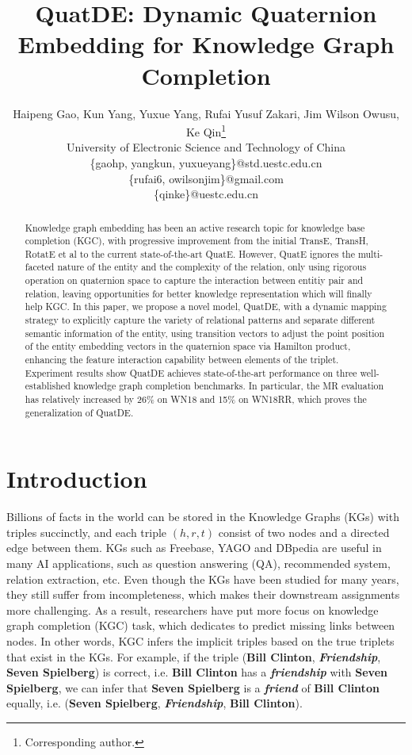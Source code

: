 \documentclass[letterpaper]{article} \usepackage{aaai20}  \usepackage{times}  \usepackage{helvet} \usepackage{courier}  \usepackage[hyphens]{url}  \usepackage{graphicx} \usepackage{lineno,hyperref,amsmath,amssymb}
\title{QuatDE: Dynamic Quaternion Embedding for Knowledge Graph Completion}
\author{Haipeng Gao, Kun Yang, Yuxue Yang, Rufai Yusuf Zakari, Jim Wilson Owusu, Ke Qin\thanks{Corresponding author.}\\
University of Electronic Science and Technology of China\\ 
\{gaohp, yangkun, yuxueyang\}@std.uestc.edu.cn\\
\{rufai6, owilsonjim\}@gmail.com\\
\{qinke\}@uestc.edu.cn
}
\begin{document}
\maketitle

\begin{abstract}
Knowledge graph embedding has been an active research topic for knowledge base completion (KGC), with progressive improvement from the initial TransE, TransH, RotatE et al to the current state-of-the-art QuatE. However, QuatE ignores the multi-faceted nature of the entity and the complexity of the relation, only using rigorous operation on quaternion space to capture the interaction between entitiy pair and relation, leaving opportunities for better knowledge representation which will finally help KGC. In this paper, we propose a novel model, QuatDE, with a dynamic mapping strategy to explicitly capture the variety of relational patterns and separate different semantic information of the entity, using transition vectors to adjust the point position of the entity embedding vectors in the quaternion space via Hamilton product, enhancing the feature interaction capability between elements of the triplet.  Experiment results show QuatDE achieves state-of-the-art performance on three well-established knowledge graph completion benchmarks. In particular, the MR evaluation has relatively increased by 26\% on WN18 and 15\% on WN18RR, which proves the generalization of QuatDE.
\end{abstract}


\section{Introduction}

Billions of facts in the world can be stored in the Knowledge Graphs (KGs) with triples succinctly, and each triple $(h,r,t)$ consist of two nodes and a directed edge between them. KGs such as Freebase\cite{bollacker2008freebase}, YAGO\cite{suchanek2007yago} and DBpedia\cite{lehmann2015dbpedia} are useful in many AI applications, such as question answering (QA)\cite{cui2019kbqa}, recommended system\cite{wang2018dkn}, relation extraction\cite{wang2020direction}, etc. Even though the KGs have been studied for many years, they still suffer from incompleteness, which makes their downstream assignments more challenging. As a result, researchers have put more focus on knowledge graph completion (KGC) task, which dedicates to predict missing links between nodes. In other words, KGC infers the implicit triples based on the true triplets that exist in the KGs. For example, if the triple (\textbf{Bill Clinton}, \textbf{\textit{Friendship}}, \textbf{Seven Spielberg}) is correct, i.e. \textbf{Bill Clinton} has a \textbf{\textit{friendship}} with \textbf{Seven Spielberg}, we can infer that \textbf{Seven Spielberg} is a \textbf{\textit{friend}} of \textbf{Bill Clinton} equally, i.e. (\textbf{Seven Spielberg}, \textbf{\textit{Friendship}}, \textbf{Bill Clinton}).
\end{document}
